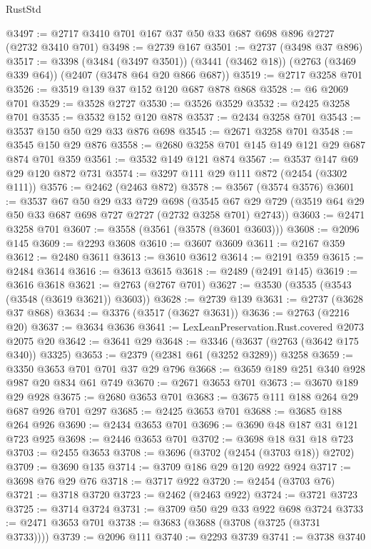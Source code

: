 \begin{lexlean}{RustStd}
\begin{coremodule}
@3497 := @2717 @3410 @701 @167 @37 @50 @33 @687 @698 @896 @2727 (@2732 @3410 @701)
@3498 := @2739 @167
@3501 := @2737 (@3498 @37 @896)
@3517 := @3398
    (@3484 (@3497 @3501))
    (@3441 (@3462 @18))
    (@2763 (@3469 @339 @64))
    (@2407 (@3478 @64 @20 @866 @687))
@3519 := @2717 @3258 @701
@3526 := @3519 @139 @37 @152 @120 @687 @878 @868
@3528 := @6 @2069 @701
@3529 := @3528 @2727
@3530 := @3526 @3529
@3532 := @2425 @3258 @701
@3535 := @3532 @152 @120 @878
@3537 := @2434 @3258 @701
@3543 := @3537 @150 @50 @29 @33 @876 @698
@3545 := @2671 @3258 @701
@3548 := @3545 @150 @29 @876
@3558 := @2680 @3258 @701 @145 @149 @121 @29 @687 @874 @701 @359
@3561 := @3532 @149 @121 @874
@3567 := @3537 @147 @69 @29 @120 @872 @731
@3574 := @3297 @111 @29 @111 @872 (@2454 (@3302 @111))
@3576 := @2462 (@2463 @872)
@3578 := @3567 (@3574 @3576)
@3601 := @3537
    @67
    @50
    @29
    @33
    @729
    @698
    (@3545 @67 @29 @729 (@3519 @64 @29 @50 @33 @687 @698 @727 @2727 (@2732 @3258 @701) @2743))
@3603 := @2471 @3258 @701
@3607 := @3558 (@3561 (@3578 (@3601 @3603)))
@3608 := @2096 @145
@3609 := @2293 @3608
@3610 := @3607 @3609
@3611 := @2167 @359
@3612 := @2480 @3611
@3613 := @3610 @3612
@3614 := @2191 @359
@3615 := @2484 @3614
@3616 := @3613 @3615
@3618 := @2489 (@2491 @145)
@3619 := @3616 @3618
@3621 := @2763 (@2767 @701)
@3627 := @3530 (@3535 (@3543 (@3548 (@3619 @3621)) @3603))
@3628 := @2739 @139
@3631 := @2737 (@3628 @37 @868)
@3634 := @3376 (@3517 (@3627 @3631))
@3636 := @2763 (@2216 @20)
@3637 := @3634 @3636
@3641 := LexLeanPreservation.Rust.covered @2073 @2075 @20
@3642 := @3641 @29
@3648 := @3346 (@3637 (@2763 (@3642 @175 @340)) @3325)
@3653 := @2379 (@2381 @61 (@3252 @3289)) @3258
@3659 := @3350 @3653 @701 @701 @37 @29 @796
@3668 := @3659 @189 @251 @340 @928 @987 @20 @834 @61 @749
@3670 := @2671 @3653 @701
@3673 := @3670 @189 @29 @928
@3675 := @2680 @3653 @701
@3683 := @3675 @111 @188 @264 @29 @687 @926 @701 @297
@3685 := @2425 @3653 @701
@3688 := @3685 @188 @264 @926
@3690 := @2434 @3653 @701
@3696 := @3690 @48 @187 @31 @121 @723 @925
@3698 := @2446 @3653 @701
@3702 := @3698 @18 @31 @18 @723
@3703 := @2455 @3653
@3708 := @3696 (@3702 (@2454 (@3703 @18)) @2702)
@3709 := @3690 @135
@3714 := @3709 @186 @29 @120 @922 @924
@3717 := @3698 @76 @29 @76
@3718 := @3717 @922
@3720 := @2454 (@3703 @76)
@3721 := @3718 @3720
@3723 := @2462 (@2463 @922)
@3724 := @3721 @3723
@3725 := @3714 @3724
@3731 := @3709 @50 @29 @33 @922 @698 @3724
@3733 := @2471 @3653 @701
@3738 := @3683 (@3688 (@3708 (@3725 (@3731 @3733))))
@3739 := @2096 @111
@3740 := @2293 @3739
@3741 := @3738 @3740

\end{coremodule}
\end{lexlean}

